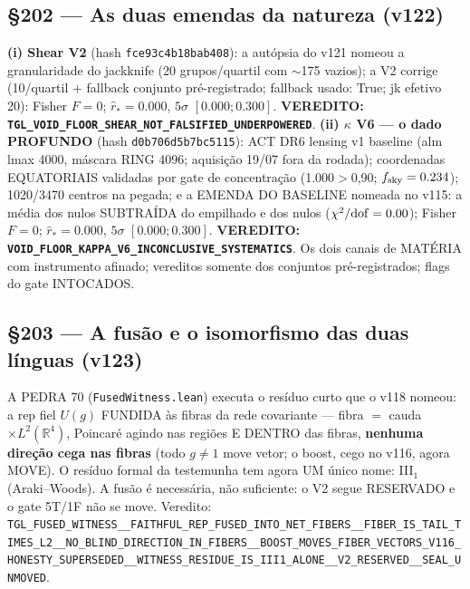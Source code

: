 \documentclass[11pt]{article}
\theoremstyle{definition}\newtheorem{deriv}{Derivação}
\begin{document}
\subsection*{\S202 --- As duas emendas da natureza (v122)}\textbf{(i) Shear V2} (hash \texttt{fce93c4b18bab408}): a autópsia do v121 nomeou a granularidade do jackknife (20 grupos/quartil com $\sim$175 vazios); a V2 corrige (10/quartil $+$ fallback conjunto pré-registrado; fallback usado: True; jk efetivo 20): Fisher $F=0$; $\hat r_*=0.000$, $5\sigma$ $[0.000;0.300]$. \textbf{VEREDITO: \texttt{TGL\_VOID\_FLOOR\_SHEAR\_NOT\_FALSIFIED\_UNDERPOWERED}}. \textbf{(ii) $\kappa$ V6 --- o dado PROFUNDO} (hash \texttt{d0b706d5b7bc5115}): ACT DR6 lensing v1 baseline (alm lmax 4000, máscara RING 4096; aquisição 19/07 fora da rodada); coordenadas EQUATORIAIS validadas por gate de concentração (1.000$>$0,90; $f_{\rm sky}=0.234$); 1020/3470 centros na pegada; e a EMENDA DO BASELINE nomeada no v115: a média dos nulos SUBTRAÍDA do empilhado e dos nulos ($\chi^2/{\rm dof}=0.00$); Fisher $F=0$; $\hat r_*=0.000$, $5\sigma$ $[0.000;0.300]$. \textbf{VEREDITO: \texttt{VOID\_FLOOR\_KAPPA\_V6\_INCONCLUSIVE\_SYSTEMATICS}}. Os dois canais de MATÉRIA com instrumento afinado; vereditos somente dos conjuntos pré-registrados; flags do gate INTOCADOS.

\subsection*{\S203 --- A fusão e o isomorfismo das duas línguas (v123)}A PEDRA 70 (\texttt{FusedWitness.lean}) executa o resíduo curto que o v118 nomeou: a rep fiel $U(g)$ FUNDIDA às fibras da rede covariante --- fibra $=$ cauda $\times L^2(\mathbb{R}^4)$, Poincaré agindo nas regiões E DENTRO das fibras, \textbf{nenhuma direção cega nas fibras} (todo $g\neq1$ move vetor; o boost, cego no v116, agora MOVE). O resíduo formal da testemunha tem agora UM único nome: III$_1$ (Araki--Woods). A fusão é necessária, não suficiente: o V2 segue RESERVADO e o gate 5T/1F não se move. Veredito: \texttt{TGL\_FUSED\_WITNESS\_\_FAITHFUL\_REP\_FUSED\_INTO\_NET\_FIBERS\_\_FIBER\_IS\_TAIL\_TIMES\_L2\_\_NO\_BLIND\_DIRECTION\_IN\_FIBERS\_\_BOOST\_MOVES\_FIBER\_VECTORS\_V116\_HONESTY\_SUPERSEDED\_\_WITNESS\_RESIDUE\_IS\_III1\_ALONE\_\_V2\_RESERVED\_\_SEAL\_UNMOVED}.
\end{document}
